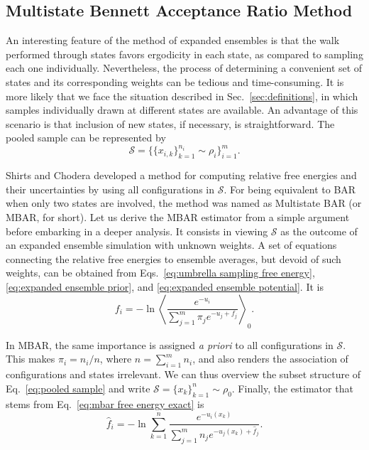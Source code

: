 \documentclass[aip,jcp,reprint,amsmath,amssymb]{revtex4-1}
\begin{document}
\subsection{Multistate Bennett Acceptance Ratio Method}

An interesting feature of the method of expanded ensembles is that the walk performed through states favors ergodicity in each state, as compared to sampling each one individually. Nevertheless, the process of determining a convenient set of states and its corresponding weights can be tedious and time-consuming. It is more likely that we face the situation described in Sec.~\ref{sec:definitions}, in which samples individually drawn at different states are available. An advantage of this scenario is that inclusion of new states, if necessary, is straightforward. The pooled sample can be represented by
\begin{equation}
\label{eq:pooled sample}
\mathcal S = \Big\{\{x_{i,k}\}_{k=1}^{n_i} \sim \rho_i \Big\}_{i=1}^m.
\end{equation}

Shirts and Chodera\cite{Shirts_2008} developed a method for computing relative free energies and their uncertainties by using all configurations in $\mathcal S$. For being equivalent to BAR when only two states are involved, the method was named as Multistate BAR (or MBAR, for short). Let us derive the MBAR estimator from a simple argument before embarking in a deeper analysis. It consists in viewing $\mathcal S$ as the outcome of an expanded ensemble simulation with unknown weights. A set of equations connecting the relative free energies to ensemble averages, but devoid of such weights, can be obtained from Eqs.~\eqref{eq:umbrella sampling free energy}, \eqref{eq:expanded ensemble prior}, and \eqref{eq:expanded ensemble potential}. It is
\begin{equation}
\label{eq:mbar free energy exact}
f_i = -\ln \left\langle \frac{e^{-u_i}}{\sum_{j=1}^m \pi_j e^{-u_j + f_j}} \right\rangle_0.
\end{equation}

In MBAR, the same importance is assigned \textit{a priori} to all configurations in $\mathcal S$. This makes $\pi_i = n_i/n$, where $n = \sum_{i=1}^m n_i$, and also renders the association of configurations and states irrelevant. We can thus overview the subset structure of Eq.~\eqref{eq:pooled sample} and write $\mathcal S = \{x_k\}_{k=1}^n \sim \rho_0$. Finally, the estimator that stems from Eq.~\eqref{eq:mbar free energy exact} is
\begin{equation}
\label{eq:mbar free energy estimator}
\hat f_i = -\ln \sum_{k=1}^n \frac{e^{-u_i(x_k)}}{\sum_{j=1}^m n_j e^{-u_j(x_k) + \hat f_j}}.
\end{equation}
\end{document}

